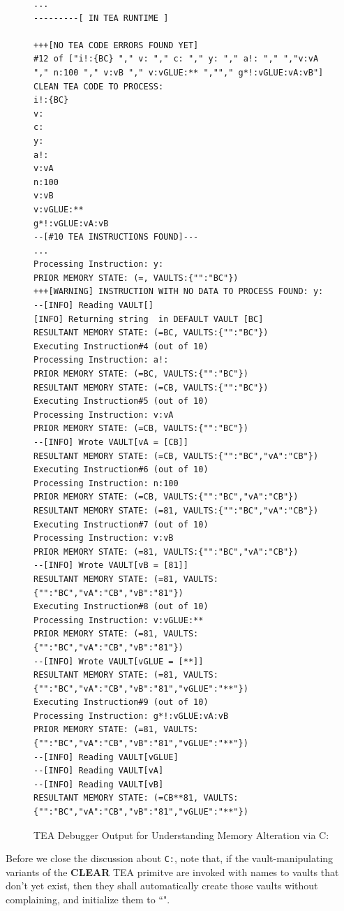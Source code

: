 \documentclass[a4paper, 18pt]{book} %
\begin{document}
\begin{figure}[H]
  \centering
  \begin{tcolorbox}[myterminalstyle, title=Truncated TEA Debugger Output from executing \textbf{\autoref{LSTC5}}]
  \begin{lstlisting}
...
---------[ IN TEA RUNTIME ]

+++[NO TEA CODE ERRORS FOUND YET]
#12 of ["i!:{BC} "," v: "," c: "," y: "," a!: "," ","v:vA "," n:100 "," v:vB "," v:vGLUE:** ",""," g*!:vGLUE:vA:vB"]
CLEAN TEA CODE TO PROCESS:
i!:{BC} 
v: 
c: 
y: 
a!: 
v:vA 
n:100 
v:vB 
v:vGLUE:** 
g*!:vGLUE:vA:vB
--[#10 TEA INSTRUCTIONS FOUND]---
...
Processing Instruction: y: 
PRIOR MEMORY STATE: (=, VAULTS:{"":"BC"})
+++[WARNING] INSTRUCTION WITH NO DATA TO PROCESS FOUND: y: 
--[INFO] Reading VAULT[]
[INFO] Returning string  in DEFAULT VAULT [BC]
RESULTANT MEMORY STATE: (=BC, VAULTS:{"":"BC"})
Executing Instruction#4 (out of 10)
Processing Instruction: a!: 
PRIOR MEMORY STATE: (=BC, VAULTS:{"":"BC"})
RESULTANT MEMORY STATE: (=CB, VAULTS:{"":"BC"})
Executing Instruction#5 (out of 10)
Processing Instruction: v:vA 
PRIOR MEMORY STATE: (=CB, VAULTS:{"":"BC"})
--[INFO] Wrote VAULT[vA = [CB]]
RESULTANT MEMORY STATE: (=CB, VAULTS:{"":"BC","vA":"CB"})
Executing Instruction#6 (out of 10)
Processing Instruction: n:100 
PRIOR MEMORY STATE: (=CB, VAULTS:{"":"BC","vA":"CB"})
RESULTANT MEMORY STATE: (=81, VAULTS:{"":"BC","vA":"CB"})
Executing Instruction#7 (out of 10)
Processing Instruction: v:vB 
PRIOR MEMORY STATE: (=81, VAULTS:{"":"BC","vA":"CB"})
--[INFO] Wrote VAULT[vB = [81]]
RESULTANT MEMORY STATE: (=81, VAULTS:{"":"BC","vA":"CB","vB":"81"})
Executing Instruction#8 (out of 10)
Processing Instruction: v:vGLUE:** 
PRIOR MEMORY STATE: (=81, VAULTS:{"":"BC","vA":"CB","vB":"81"})
--[INFO] Wrote VAULT[vGLUE = [**]]
RESULTANT MEMORY STATE: (=81, VAULTS:{"":"BC","vA":"CB","vB":"81","vGLUE":"**"})
Executing Instruction#9 (out of 10)
Processing Instruction: g*!:vGLUE:vA:vB
PRIOR MEMORY STATE: (=81, VAULTS:{"":"BC","vA":"CB","vB":"81","vGLUE":"**"})
--[INFO] Reading VAULT[vGLUE]
--[INFO] Reading VAULT[vA]
--[INFO] Reading VAULT[vB]
RESULTANT MEMORY STATE: (=CB**81, VAULTS:{"":"BC","vA":"CB","vB":"81","vGLUE":"**"})
  \end{lstlisting}
  \end{tcolorbox}
  \caption{TEA Debugger Output for Understanding Memory Alteration via C:}
  \label{FIGC6}
\end{figure}

Before we close the discussion about \texttt{C:}, note that, if the vault-manipulating variants of the \textbf{CLEAR} TEA primitve are invoked with names to vaults that don't yet exist, then they shall automatically create those vaults without complaining, and initialize them to ``". 
\end{document}
